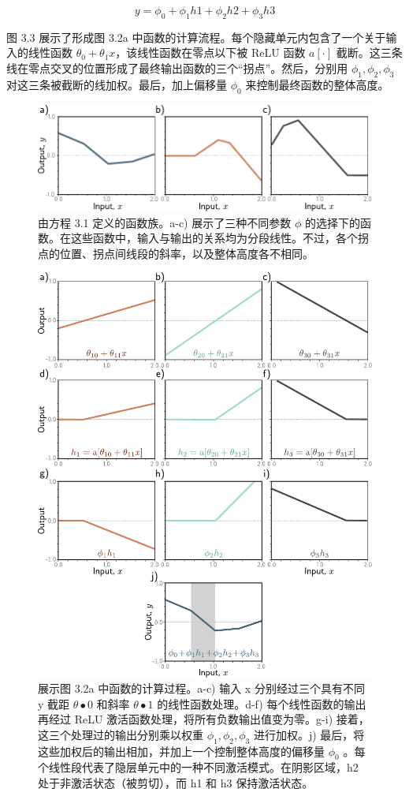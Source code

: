 \documentclass[lang=cn,newtx,10pt,scheme=chinese]{elegantbook}
\begin{document}
\begin{equation}
y = \phi_0 + \phi_1h1 + \phi_2h2 + \phi_3h3 
\end{equation}

图 3.3 展示了形成图 3.2a 中函数的计算流程。每个隐藏单元内包含了一个关于输入的线性函数 \(\theta_0 + \theta_1x\)，该线性函数在零点以下被 ReLU 函数 \(a[\cdot]\) 截断。这三条线在零点交叉的位置形成了最终输出函数的三个“拐点”。然后，分别用 \(\phi_1, \phi_2, \phi_3\) 对这三条被截断的线加权。最后，加上偏移量 \(\phi_0\) 来控制最终函数的整体高度。

\begin{figure}[ht!]
	\centering
	\includegraphics[width=0.7\linewidth]{PDFFigures/UDLChap3PDF/ShallowFunctions.pdf}
\caption{由方程 3.1 定义的函数族。a-c) 展示了三种不同参数 \(\phi\) 的选择下的函数。在这些函数中，输入与输出的关系均为分段线性。不过，各个拐点的位置、拐点间线段的斜率，以及整体高度各不相同。}
\end{figure}

\begin{figure}[ht!]
	\centering
	\includegraphics[width=0.7\linewidth]{PDFFigures/UDLChap3PDF/ShallowBuildUp.pdf}
\caption{展示图 3.2a 中函数的计算过程。a-c) 输入 x 分别经过三个具有不同 y 截距 \(\theta•0\) 和斜率 \(\theta•1\) 的线性函数处理。d-f) 每个线性函数的输出再经过 ReLU 激活函数处理，将所有负数输出值变为零。g-i) 接着，这三个处理过的输出分别乘以权重 \(\phi_1 , \phi_2 , \phi_3\) 进行加权。j) 最后，将这些加权后的输出相加，并加上一个控制整体高度的偏移量 \(\phi_0\) 。每个线性段代表了隐层单元中的一种不同激活模式。在阴影区域，h2 处于非激活状态（被剪切），而 h1 和 h3 保持激活状态。}
\end{figure}
\end{document}
